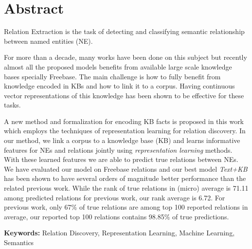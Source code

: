\chapter*{Abstract}

Relation Extraction is the task of detecting and classifying semantic relationship 
between named entities (NE).

For more than a decade, many works have been done on this subject but recently
almost all the proposed models benefits from available large scale knowledge
bases specially Freebase. The main challenge is how to fully benefit from
knowledge encoded in KBs and how to link it to a corpus. Having continuous
vector representations of this knowledge has been shown to be effective for
these tasks.

A new method and formalization for encoding KB facts is proposed in this
work which employs the techniques of representation learning for relation discovery.
 In our method, we link a corpus to a knowledge base (KB)
and learns informative features for NEs and relations jointly using
\emph{representation learning} methods. With these learned features
we are able to predict true relations between NEs.
We have evaluated our model on Freebase relations and our best model
\emph{Text+KB} has been shown to have  several orders of
magnitude better performance than the related previous work. While the rank
of true relations in (micro) average is 71.11 among predicted relations for
previous work, our rank average is 6.72. For previous work, only 67\% of
true relations are among top 100 reported relations in average, our reported top
100 relations contains 98.85\% of true predictions.

\vspace{3cm}

\textbf{Keywords:} Relation Discovery, Representation Learning, Machine
Learning, Semantics

